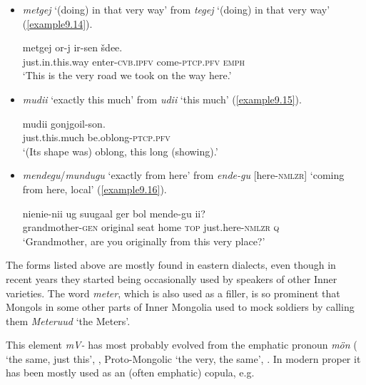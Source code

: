 \documentclass[output=paper,colorlinks,citecolor=brown]{langscibook}
\begin{document}
\begin{itemize}
\item \textit{metgej} ‘(doing) in that very way’ from \textit{tegej} ‘(doing) in that very way’ (\ref{example9.14}).

\ea
    \label{example9.14}
    \gll metgej 			or-j 			ir-sen 			šdee.\\
    just.in.this.way 	enter-\textsc{cvb.ipfv}	come-\textsc{ptcp.pfv} \textsc{emph}\\
    \glt `This is the very road we took on the way here.'\\
    \z

\item \textit{mudii} ‘exactly this much’ from \textit{udii} ‘this much’ (\ref{example9.15}).

\ea
    \label{example9.15}
    \gll mudii 			gonjgoil-son.\\
    just.this.much  	be.oblong-\textsc{ptcp.pfv}\\
    \glt `(Its shape was) oblong, this long (showing).'\\
    \z

\item \textit{mendegu}/\textit{mundugu} ‘exactly from here’ from \textit{ende-gu} [here-\textsc{nmlzr}] ‘coming from here, local’ (\ref{example9.16}).

\ea
    \label{example9.16}
    \gll nienie-nii 		ug 		suugaal 	ger 	bol 	mende-gu 		ii?\\
    grandmother-\textsc{gen} 	original 	seat 		home 	\textsc{top} 	just.here-\textsc{nmlzr} 	\textsc{q}\\
    \glt `Grandmother, are you originally from this very place?'\\
    \z
\end{itemize}

The forms listed above are mostly found in eastern  dialects, even though in recent years they started being occasionally used by speakers of other Inner  varieties. The word \textit{meter}, which is also used as a filler, is so prominent that Mongols in some other parts of Inner Mongolia used to mock  soldiers by calling them \textit{Meteruud} ‘the Meters’.

This element \textit{mV-} has most probably evolved from the  emphatic pronoun \textit{mön} ( ‘the same, just this’, \citet[51]{Poppe2006}, Proto-Mon\-gol\-ic ‘the very, the same’, \citet[20]{Janhunen2003a}. In modern  proper it has been mostly used as an (often emphatic) copula, e.g.
\end{document}
